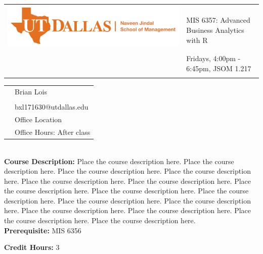 \documentclass[11pt]{article}
\begin{document}
\begin{tabular}{ l l }
  \multirow{3}{*}{\includegraphics[scale=.3]{UTD_SOM_logo.jpg}} & \LARGE  \\\\
  & \LARGE MIS 6357: Advanced Business Analytics with R \\\\
  & \LARGE Fridays, 4:00pm - 6:45pm, JSOM 1.217 \\\\
\end{tabular}
\vspace{10mm}

\begin{tabular}{ l l }
 & \large Brian Lois \\\\
  & \large bxl171630@utdallas.edu \\
  & \large Office Location \\
  & \large Office Hours: After class \\
\end{tabular}
\vspace{5mm}

\textbf {\large \\ Course Description:} Place the course description here. Place the course description here. Place the course description here. Place the course description here. Place the course description here. Place the course description here. Place the course description here. Place the course description here. Place the course description here. Place the course description here. Place the course description here. Place the course description here. Place the course description here. Place the course description here. Place the course description here. \\
\textbf {Prerequisite:} MIS 6356

\textbf {Credit Hours:} 3 \\
\end{document}
